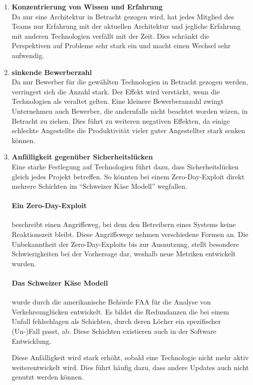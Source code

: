 \documentclass[./einleitung.tex]{subfiles}
\begin{document}
\begin{enumerate}
\item \textbf{Konzentrierung von Wissen und Erfahrung \cite{cury2024knowledge}} \\
Da nur eine Architektur in Betracht gezogen wird, hat jedes Mitglied des Teams nur Erfahrung mit der aktuellen Architektur und jegliche Erfahrung mit anderen Technologien verfällt mit der Zeit.
Dies schränkt die Perspektiven auf Probleme sehr stark ein und macht einen Wechsel sehr aufwendig.
\item \textbf{sinkende Bewerberzahl} \\
Da nur Bewerber für die gewählten Technologien in Betracht gezogen werden, verringert sich die Anzahl stark.
Der Effekt wird verstärkt, wenn die Technologien als veraltet gelten.
Eine kleinere Bewerberanzahl zwingt Unternehmen auch Bewerber, die andernfalls nicht beachtet worden wären, in Betracht zu ziehen.
Dies führt zu weiteren negativen Effekten, da einige schlechte Angestellte die Produktivität vieler guter Angestellter stark senken können.
\item \textbf{Anfälligkeit gegenüber Sicherheitslücken} \\
Eine starke Festlegung auf Technologien führt dazu, dass Sicherheitslücken gleich jedes Projekt betreffen.
So könnten bei einem Zero-Day-Exploit direkt mehrere Schichten im ``Schweizer Käse Modell'' wegfallen.
\begin{center}
    \paragraph{Ein Zero-Day-Exploit} beschreibt einen Angriffsweg, bei dem den Betreibern eines Systems keine Reaktionszeit bleibt. \cite{ibmZeroDay}
    Diese Angriffswege nehmen verschiedene Formen an.
    Die Unbekanntheit der Zero-Day-Exploits bis zur Ausnutzung, stellt besondere Schwierigkeiten bei der Vorhersage dar, weshalb neue Metriken entwickelt wurden. \cite{wang2013k}
\end{center}
\begin{center}
    \paragraph{Das Schweizer Käse Modell} wurde durch die amerikanische Behörde FAA für die Analyse von Verkehrsunglücken entwickelt.
    Es bildet die Redundanzen die bei einem Unfall fehlschlagen als Schichten, durch deren Löcher ein spezifischer (Un-)Fall passt, ab.
    Diese Schichten existieren auch in der Software Entwicklung.\cite{bergeon2009swiss} %
\end{center}
Diese Anfälligkeit wird stark erhöht, sobald eine Technologie nicht mehr aktiv weiterentwickelt wird.
Dies führt häufig dazu, dass andere Updates auch nicht genutzt werden können.
\end{enumerate}
\end{document}
